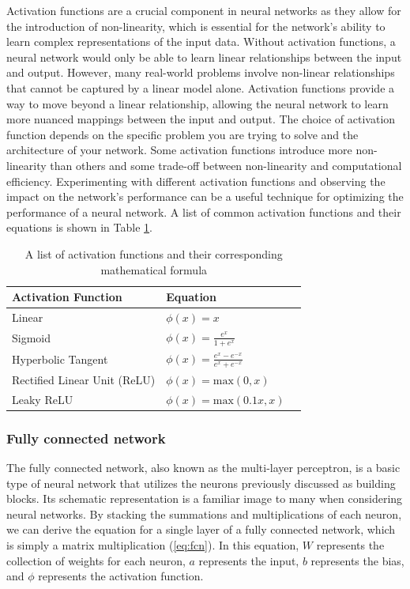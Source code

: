 Activation functions are a crucial component in neural networks as they allow for the introduction of non-linearity, which is essential for the network's ability to learn complex representations of the input data.
Without activation functions, a neural network would only be able to learn linear relationships between the input and output.
However, many real-world problems involve non-linear relationships that cannot be captured by a linear model alone.
Activation functions provide a way to move beyond a linear relationship, allowing the neural network to learn more nuanced mappings between the input and output.
The choice of activation function depends on the specific problem you are trying to solve and the architecture of your network.
Some activation functions introduce more non-linearity than others and some trade-off between non-linearity and computational efficiency.
Experimenting with different activation functions and observing the impact on the network's performance can be a useful technique for optimizing the performance of a neural network.
A list of common activation functions and their equations is shown in Table \ref{tab:activation-functions}.

\begin{table}[H]
    \caption{A list of activation functions and their corresponding mathematical formula} \label{tab:activation-functions}
    \begin{tabularx}{\columnwidth}{|X|X|X|}
        \hline
        {\bf Activation Function} & {\bf Equation} \\ \hline 
        Linear & $\phi(x) = x$ \\\hline
        Sigmoid & $\phi(x) = \frac{e^{x}}{1 + e^{x}}$\\ \hline 
        Hyperbolic Tangent & $\phi(x) = \frac{e^x - e^{-x}}{e^{x} + e^{-x}}$\\ \hline 
        Rectified Linear Unit (ReLU) & $\phi(x) = \text{max}(0,x)$\\ \hline 
        Leaky ReLU & $\phi(x) = \text{max}(0.1x,x)$ \\ \hline 
    \end{tabularx}
\end{table}

\subsubsection{Fully connected network}
The fully connected network, also known as the multi-layer perceptron, is a basic type of neural network that utilizes the neurons previously discussed as building blocks.
Its schematic representation is a familiar image to many when considering neural networks.
By stacking the summations and multiplications of each neuron, we can derive the equation for a single layer of a fully connected network, which is simply a matrix multiplication (\cref{eq:fcn}).
In this equation, $W$ represents the collection of weights for each neuron, $a$ represents the input, $b$ represents the bias, and $\phi$ represents the activation function.

